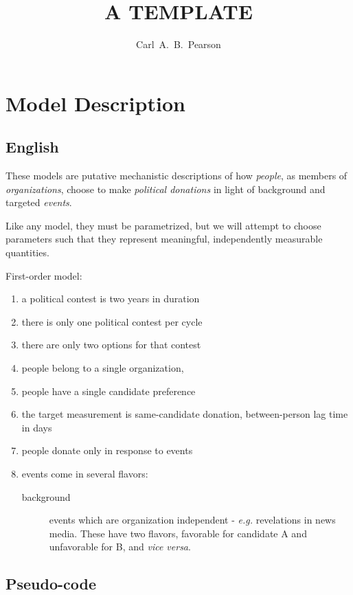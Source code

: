 \documentclass{article}
\author{Carl~A.~B.~Pearson}
\begin{document}

\title{A TEMPLATE}

\titlepage

\section{Model Description}
\subsection{English}
These models are putative mechanistic descriptions of how {\em people}, as members of {\em organizations}, choose to make {\em political donations} in light of background and targeted {\em events}.

Like any model, they must be parametrized, but we will attempt to choose parameters such that they represent meaningful, independently measurable quantities.

First-order model:
\begin{enumerate}
\item a political contest is two years in duration
\item there is only one political contest per cycle
\item there are only two options for that contest
\item people belong to a single organization,
\item people have a single candidate preference
\item the target measurement is same-candidate donation, between-person lag time in days
\item people donate only in response to events
\item events come in several flavors:\begin{description}
  \item[background] events which are organization independent - {\em e.g.} revelations in news media.  These have two flavors, favorable for candidate A and unfavorable for B, and {\em vice versa}.
\end{description}
\end{enumerate}

\subsection{Pseudo-code}
\end{document}
